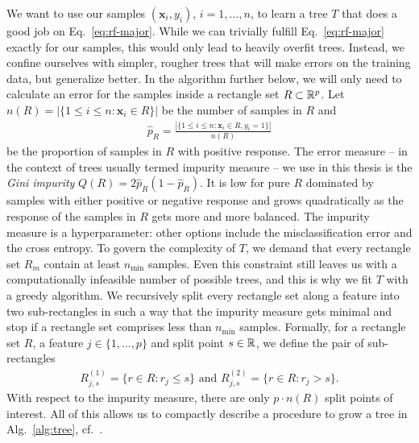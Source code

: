 We want to use our samples $(\mathbf{x}_i, y_i)$, $i = 1, \ldots, n$, to learn a tree $T$ that does 
a good job on Eq.\ \eqref{eq:rf-major}. While we can 
trivially fulfill Eq.\ \eqref{eq:rf-major} exactly for our samples, this would only lead to heavily
overfit trees. Instead, we confine ourselves with simpler, rougher trees that will make errors on 
the training data, but generalize better. 
In the algorithm further below, we will only need to calculate an error for the samples inside a 
rectangle set $R \subset \mathbb{R}^p$. Let $n(R) = |\{ 1 \leq i \leq n: \mathbf{x}_i \in R \}|$ be the number of 
samples in $R$ and
\begin{align}
    \hat{p}_R = \frac{|\{ 1 \leq i \leq n: \mathbf{x}_i \in R, y_i = 1 \}|}{n(R)}
\end{align}
be the proportion of samples in $R$ with positive response. The error measure -- in the context of 
trees usually termed impurity measure -- we use in this thesis
is the \textit{Gini impurity} $Q(R) = 2 \hat{p}_R (1 - \hat{p}_R)$. It is low for pure $R$ dominated by 
samples with either positive or negative response and grows quadratically as the response of the 
samples in $R$ gets more and more balanced. The impurity measure is a hyperparameter: other 
options include the misclassification error and the cross entropy. To govern the complexity of $T$,
we demand that every rectangle set $R_m$ contain at least $n_\text{min}$ samples. Even this 
constraint still leaves us with a computationally infeasible number of possible trees, and this is 
why we fit $T$ with a greedy algorithm. We recursively split every rectangle set along a 
feature into two sub-rectangles in such a way that the impurity measure gets minimal and stop if 
a rectangle set comprises less than $n_\text{min}$ samples. Formally, for a rectangle set $R$, a 
feature $j \in \{1, \ldots, p\}$ and split point $s \in \mathbb{R}$, we define 
the pair of sub-rectangles
\begin{align}
    R^{(1)}_{j, s} = \{r \in R: r_j \leq s\} \text{ and } R^{(2)}_{j, s} = \{r \in R: r_j > s\}.
\end{align}
With respect to the impurity measure, there are only $p \cdot n(R)$ split points of interest. 
All of this allows us to compactly describe a procedure to grow a 
tree in Alg.\ \ref{alg:tree}, cf.\ \cite{breiman84}.


